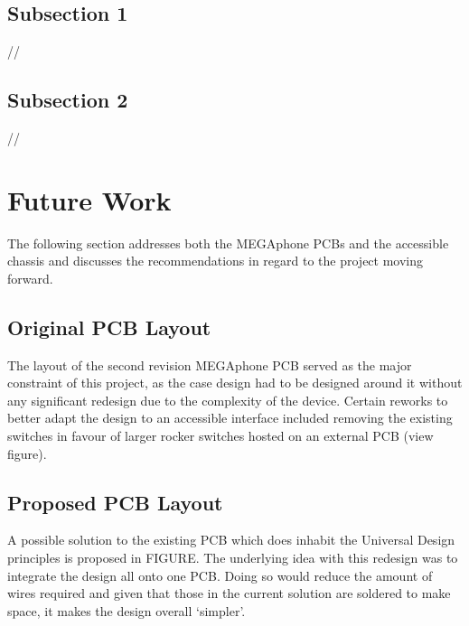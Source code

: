 \subsection{Subsection 1}
//

\subsection{Subsection 2}
//


\section{Future Work}
The following section addresses both the MEGAphone PCBs and the accessible chassis and discusses the recommendations in regard to the project moving forward.

\subsection{Original PCB Layout}

The layout of the second revision MEGAphone PCB served as the major constraint of this project, as the case design had to be designed around it without any significant redesign due to the complexity of the device. 
Certain reworks to better adapt the design to an accessible interface included removing the existing switches in favour of larger rocker switches hosted on an external PCB (view figure).

\subsection{Proposed PCB Layout}

A possible solution to the existing PCB which does inhabit the Universal Design principles is proposed in FIGURE. 
The underlying idea with this redesign was to integrate the design all onto one PCB. 
Doing so would reduce the amount of wires required and given that those in the current solution are soldered to make space, it makes the design overall ‘simpler’.

